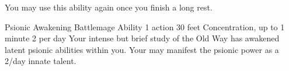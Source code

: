 You may use this ability again once you finish a long rest.


\ability%
    {Psionic Awakening}
    {Battlemage Ability}
    {1 action}
    {30 feet}
    {Concentration, up to 1 minute}
    {2 per day}
Your intense but brief study of the Old Way has awakened
latent psionic abilities within you. Your may manifest
the  psionic power as a 2/day innate talent.


